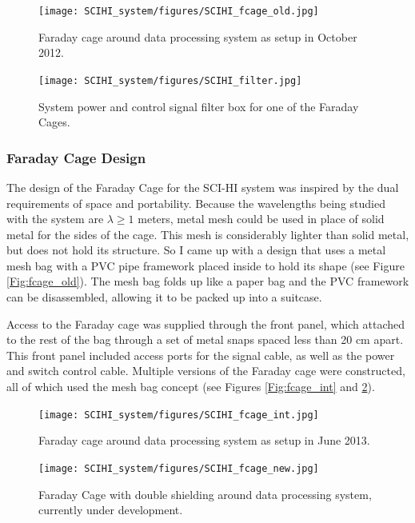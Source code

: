 \begin{figure}[htb]
\centering
\begin{minipage}[b]{0.36\textwidth}
\centering
\texttt{[image: SCIHI\_system/figures/SCIHI\_fcage\_old.jpg]}
\caption{Faraday cage around data processing system as setup in October 2012.}
\label{Fig:fcage_old}
\end{minipage}%
\begin{minipage}[b]{0.02\textwidth}
\hspace{1cm}
\end{minipage}%
\begin{minipage}[b]{0.58\textwidth}
\centering
\texttt{[image: SCIHI\_system/figures/SCIHI\_filter.jpg]}
\caption{System power and control signal filter box for one of the Faraday Cages.}
\label{Fig:fcage_filter}
\end{minipage}
\end{figure}

\subsubsection{Faraday Cage Design}
The design of the Faraday Cage for the SCI-HI system was inspired by the dual requirements of space and portability. Because the wavelengths being studied with the system are $\lambda \geq 1$ meters, metal mesh could be used in place of solid metal for the sides of the cage. This mesh is considerably lighter than solid metal, but does not hold its structure. So I came up with a design that uses a metal mesh bag with a PVC pipe framework placed inside to hold its shape (see Figure \ref{Fig:fcage_old}). The mesh bag folds up like a paper bag and the PVC framework can be disassembled, allowing it to be packed up into a suitcase. 

Access to the Faraday cage was supplied through the front panel, which attached to the rest of the bag through a set of metal snaps spaced less than 20 cm apart. This front panel included access ports for the signal cable, as well as the power and switch control cable. Multiple versions of the Faraday cage were constructed, all of which used the mesh bag concept (see Figures \ref{Fig:fcage_int} and \ref{Fig:fcage_new}). 

\begin{figure}[htb]
\centering
\begin{minipage}[b]{0.44\textwidth}
\centering
\texttt{[image: SCIHI\_system/figures/SCIHI\_fcage\_int.jpg]}
\caption{Faraday cage around data processing system as setup in June 2013.}
\label{Fig:fcage_int}
\end{minipage}%
\begin{minipage}[b]{0.02\textwidth}
\hspace{1cm}
\end{minipage}%
\begin{minipage}[b]{0.50\textwidth}
\centering
\texttt{[image: SCIHI\_system/figures/SCIHI\_fcage\_new.jpg]}
\caption{Faraday Cage with double shielding around data processing system, currently under development.}
\label{Fig:fcage_new}
\end{minipage}
\end{figure}

